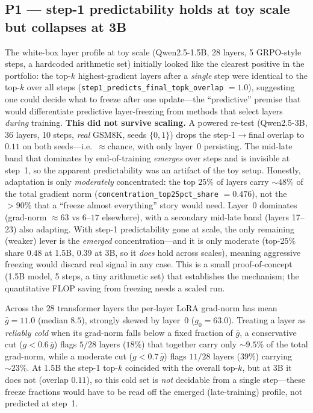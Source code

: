 \documentclass[12pt,a4paper]{report}
\begin{document}
\subsection{P1 --- step-1 predictability holds at toy scale but collapses at 3B}

The white-box layer profile at toy scale (Qwen2.5-1.5B, 28 layers, 5 GRPO-style
steps, a hardcoded arithmetic set) initially looked like the clearest positive in
the portfolio: the top-$k$ highest-gradient layers after a \emph{single} step were
identical to the top-$k$ over all steps (\texttt{step1\_predicts\_final\_topk\_overlap}
$=1.0$), suggesting one could decide what to freeze after one update---the
``predictive'' premise that would differentiate predictive layer-freezing from
methods that select layers \emph{during} training. \textbf{This did not survive
scaling.} A powered re-test (Qwen2.5-3B, 36 layers, 10 steps, \emph{real} GSM8K,
seeds $\{0,1\}$) drops the step-1$\to$final overlap to $0.11$ on both seeds---i.e.\
${\approx}$chance, with only layer~0 persisting. The mid-late band that dominates by
end-of-training \emph{emerges} over steps and is invisible at step~1, so the apparent
predictability was an artifact of the toy setup. Honestly, adaptation is only
\emph{moderately} concentrated: the top $25\%$ of layers carry ${\sim}48\%$ of the
total gradient norm (\texttt{concentration\_top25pct\_share} $=0.476$), not the
$>90\%$ that a ``freeze almost everything'' story would need. Layer~0 dominates
(grad-norm $\approx 63$ vs $6$--$17$ elsewhere), with a secondary mid-late band
(layers 17--23) also adapting. With step-1 predictability gone at scale, the only remaining (weaker) lever is the
\emph{emerged} concentration---and it is only moderate (top-25\% share $0.48$ at 1.5B,
$0.39$ at 3B, so it \emph{does} hold across scales), meaning aggressive freezing would
discard real signal in any case. This is a small proof-of-concept
(1.5B model, 5 steps, a tiny arithmetic set) that establishes the mechanism; the
quantitative FLOP saving from freezing needs a scaled run.

Across the $28$ transformer layers the per-layer LoRA grad-norm has mean
$\bar{g}=11.0$ (median $8.5$), strongly skewed by layer~0 ($g_0=63.0$). Treating a
layer as \emph{reliably cold} when its grad-norm falls below a fixed fraction of
$\bar{g}$, a conservative cut ($g<0.6\,\bar{g}$) flags $5/28$ layers ($18\%$) that
together carry only $\sim\!9.5\%$ of the total grad-norm, while a moderate cut
($g<0.7\,\bar{g}$) flags $11/28$ layers ($39\%$) carrying $\sim\!23\%$. At 1.5B the step-1 top-$k$ coincided with the overall top-$k$, but at 3B it does
not (overlap $0.11$), so this cold set is \emph{not} decidable from a single step---these
freeze fractions would have to be read off the emerged (late-training) profile, not
predicted at step~1.
\end{document}
